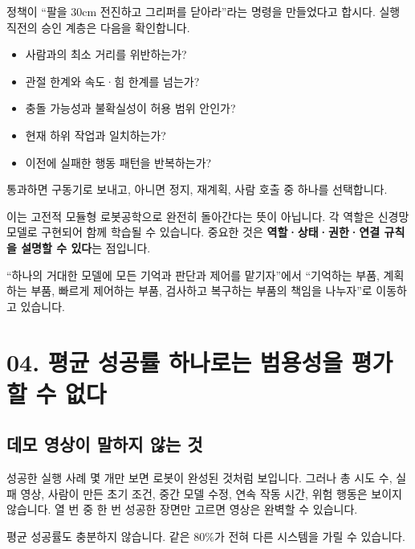 \documentclass[11pt,openany]{book}
\newcommand{\keyterm}[1]{{\sffamily\bfseries\color{deepblue}#1}}
\begin{document}
\begin{examplebox}[실행 전 안전 게이트의 확인 항목]
정책이 ``팔을 30cm 전진하고 그리퍼를 닫아라''라는 명령을 만들었다고 합시다. 실행 직전의 승인 계층은 다음을 확인합니다.

\begin{itemize}
  \item 사람과의 최소 거리를 위반하는가?
  \item 관절 한계와 속도·힘 한계를 넘는가?
  \item 충돌 가능성과 불확실성이 허용 범위 안인가?
  \item 현재 하위 작업과 일치하는가?
  \item 이전에 실패한 행동 패턴을 반복하는가?
\end{itemize}

통과하면 구동기로 보내고, 아니면 정지, 재계획, 사람 호출 중 하나를 선택합니다.
\end{examplebox}

이는 고전적 모듈형 로봇공학으로 완전히 돌아간다는 뜻이 아닙니다. 각 역할은 신경망 모델로 구현되어 함께 학습될 수 있습니다. 중요한 것은 \keyterm{역할·상태·권한·연결 규칙을 설명할 수 있다}는 점입니다.

\begin{translationbox}
``하나의 거대한 모델에 모든 기억과 판단과 제어를 맡기자''에서 ``기억하는 부품, 계획하는 부품, 빠르게 제어하는 부품, 검사하고 복구하는 부품의 책임을 나누자''로 이동하고 있습니다.
\end{translationbox}

\section*{04. 평균 성공률 하나로는 범용성을 평가할 수 없다}

\subsection*{데모 영상이 말하지 않는 것}

성공한 실행 사례 몇 개만 보면 로봇이 완성된 것처럼 보입니다. 그러나 총 시도 수, 실패 영상, 사람이 만든 초기 조건, 중간 모델 수정, 연속 작동 시간, 위험 행동은 보이지 않습니다. 열 번 중 한 번 성공한 장면만 고르면 영상은 완벽할 수 있습니다.

평균 성공률도 충분하지 않습니다. 같은 80\%가 전혀 다른 시스템을 가릴 수 있습니다.
\end{document}
